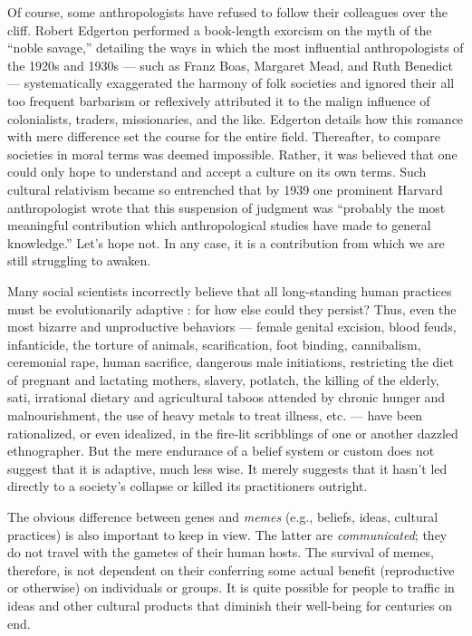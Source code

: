 \documentclass[a4paper,14pt]{extbook}
\begin{document}
Of course, some anthropologists have refused to follow their colleagues over the cliff.
Robert Edgerton performed a book-length exorcism on the myth of the ``noble savage,'' detailing the ways in which the most influential anthropologists of the 1920s and 1930s --- such as Franz Boas, Margaret Mead, and Ruth Benedict --- systematically exaggerated the harmony of folk societies and ignored their all too frequent barbarism or reflexively attributed it to the malign influence of colonialists, traders, missionaries, and the like.
Edgerton details how this romance with mere difference set the course for the entire field.
Thereafter, to compare societies in moral terms was deemed impossible.
Rather, it was believed that one could only hope to understand and accept a culture on its own terms.
Such cultural relativism became so entrenched that by 1939 one prominent Harvard anthropologist wrote that this suspension of judgment was ``probably the most meaningful contribution which anthropological studies have made to general knowledge.''
Let's hope not.
In any case, it is a contribution from which we are still struggling to awaken.

Many social scientists incorrectly believe that all long-standing human practices must be evolutionarily adaptive :
for how else could they persist?
Thus, even the most bizarre and unproductive behaviors --- female genital excision, blood feuds, infanticide, the torture of animals, scarification, foot binding, cannibalism, ceremonial rape, human sacrifice, dangerous male initiations, restricting the diet of pregnant and lactating mothers, slavery, potlatch, the killing of the elderly, sati, irrational dietary and agricultural taboos attended by chronic hunger and malnourishment, the use of heavy metals to treat illness, etc. --- have been rationalized, or even idealized, in the fire-lit scribblings of one or another dazzled ethnographer.
But the mere endurance of a belief system or custom does not suggest that it is adaptive, much less wise.
It merely suggests that it hasn't led directly to a society's collapse or killed its practitioners outright.

The obvious difference between genes and \textit{memes} (e.g., beliefs, ideas, cultural practices) is also important to keep in view.
The latter are \textit{communicated};
they do not travel with the gametes of their human hosts.
The survival of memes, therefore, is not dependent on their conferring some actual benefit (reproductive or otherwise) on individuals or groups.
It is quite possible for people to traffic in ideas and other cultural products that diminish their well-being for centuries on end.
\end{document}
